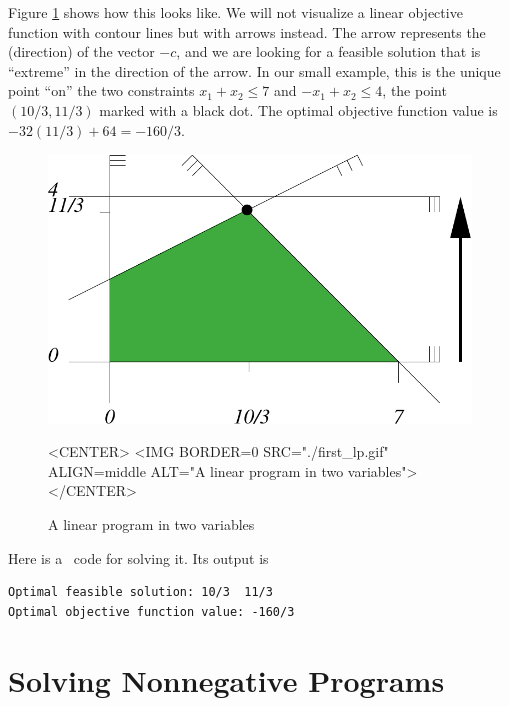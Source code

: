 Figure \ref{fig:QP-first_lp} shows how this looks like. We will not
visualize a linear objective function with contour lines but with
arrows instead. The arrow represents the (direction) of the vector $-c$,
and we are looking for a feasible solution that is ``extreme'' in the direction
of the arrow. In our small example, this is the unique point ``on'' the
two constraints $x_1+x_2\leq 7$ and $-x_1+x_2\leq 4$, the point
$(10/3,11/3)$ marked with a black dot. The optimal objective function
value is $-32(11/3)+64=-160/3$.

\begin{figure}[htbp]
\begin{ccTexOnly}
\begin{center}
\includegraphics{QP_solver/first_lp} %
\end{center}
\end{ccTexOnly}

\begin{ccHtmlOnly}
<CENTER>
<IMG BORDER=0 SRC="./first_lp.gif" ALIGN=middle ALT="A linear program in two variables">
</CENTER>
\end{ccHtmlOnly}

\caption{A linear program in two variables
\label{fig:QP-first_lp}}
\end{figure}

Here is a \cgal\ code for solving it. Its output is
\begin{verbatim}
Optimal feasible solution: 10/3  11/3
Optimal objective function value: -160/3
\end{verbatim}


\section{Solving Nonnegative Programs}\label{sec:QP-nonnegative}

